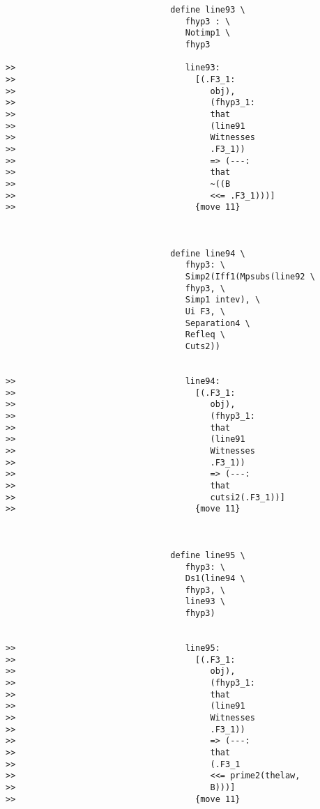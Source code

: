 \documentclass[12pt]{article}
\begin{document}
\begin{verbatim}
                                 define line93 \
                                    fhyp3 : \
                                    Notimp1 \
                                    fhyp3

>>                                  line93:
>>                                    [(.F3_1:
>>                                       obj),
>>                                       (fhyp3_1:
>>                                       that
>>                                       (line91
>>                                       Witnesses
>>                                       .F3_1))
>>                                       => (---:
>>                                       that
>>                                       ~((B
>>                                       <<= .F3_1)))]
>>                                    {move 11}



                                 define line94 \
                                    fhyp3: \
                                    Simp2(Iff1(Mpsubs(line92 \
                                    fhyp3, \
                                    Simp1 intev), \
                                    Ui F3, \
                                    Separation4 \
                                    Refleq \
                                    Cuts2))


>>                                  line94:
>>                                    [(.F3_1:
>>                                       obj),
>>                                       (fhyp3_1:
>>                                       that
>>                                       (line91
>>                                       Witnesses
>>                                       .F3_1))
>>                                       => (---:
>>                                       that
>>                                       cutsi2(.F3_1))]
>>                                    {move 11}



                                 define line95 \
                                    fhyp3: \
                                    Ds1(line94 \
                                    fhyp3, \
                                    line93 \
                                    fhyp3)


>>                                  line95:
>>                                    [(.F3_1:
>>                                       obj),
>>                                       (fhyp3_1:
>>                                       that
>>                                       (line91
>>                                       Witnesses
>>                                       .F3_1))
>>                                       => (---:
>>                                       that
>>                                       (.F3_1
>>                                       <<= prime2(thelaw,
>>                                       B)))]
>>                                    {move 11}




\end{verbatim}
\end{document}
